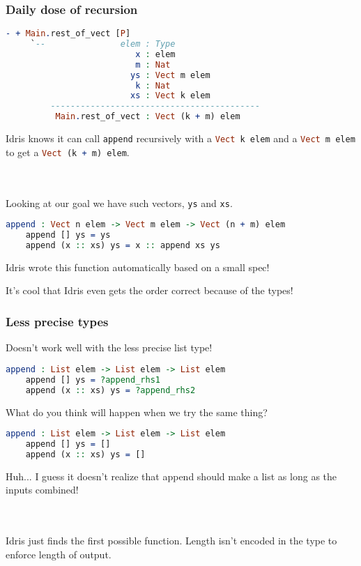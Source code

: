 \documentclass{beamer}
\begin{document}
\begin{frame}[fragile]
  \frametitle{Daily dose of recursion}

  \begin{lstlisting}[language=Idris]
    - + Main.rest_of_vect [P]
     `--               elem : Type
                          x : elem
                          m : Nat
                         ys : Vect m elem
                          k : Nat
                         xs : Vect k elem
         ------------------------------------------
          Main.rest_of_vect : Vect (k + m) elem
  \end{lstlisting}

  \pause
  Idris knows it can call \texttt{append} recursively with a \lstinline[language=Idris,columns=fixed]{Vect k elem} and a \lstinline[language=Idris,columns=fixed]{Vect m elem} to get a \lstinline[language=Idris,columns=fixed]{Vect (k + m) elem}.

  \pause \\~\\

  Looking at our goal we have such vectors, \texttt{ys} and \texttt{xs}.

  \pause
  \begin{lstlisting}[language=Idris]
    append : Vect n elem -> Vect m elem -> Vect (n + m) elem
    append [] ys = ys
    append (x :: xs) ys = x :: append xs ys
  \end{lstlisting}

  \pause
  Idris wrote this function automatically based on a small spec!

  \pause
  It's cool that Idris even gets the order correct because of the types!
\end{frame}

\begin{frame}[fragile]
  \frametitle{Less precise types}

  Doesn't work well with the less precise list type!

  \pause
  \begin{lstlisting}[language=Idris]
    append : List elem -> List elem -> List elem
    append [] ys = ?append_rhs1
    append (x :: xs) ys = ?append_rhs2
  \end{lstlisting}

  What do you think will happen when we try the same thing?

  \pause
  \begin{lstlisting}[language=Idris]
    append : List elem -> List elem -> List elem
    append [] ys = []
    append (x :: xs) ys = []
  \end{lstlisting}

  Huh... I guess it doesn't realize that append should make a list as long as the inputs combined!

  \pause \\~\\
  Idris just finds the first possible function. Length isn't encoded in the type to enforce length of output.
\end{frame}
\end{document}
